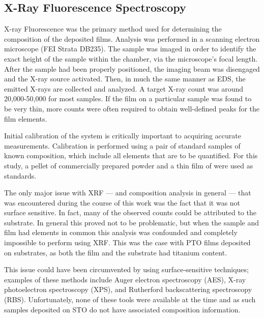 \lipsum


\subsection{X-Ray Fluorescence Spectroscopy}
\label{sec:Methods-XRF}

X-ray Fluorescence was the primary method used for determining the composition of the deposited films. Analysis was performed in a scanning electron microscope (FEI Strata DB235). The sample was imaged in order to identify the exact height of the sample within the chamber, via the microscope's focal length. After the sample had been properly positioned, the imaging beam was disengaged and the X-ray source activated. Then, in much the same manner as EDS, the emitted X-rays are collected and analyzed. A target X-ray count was around 20,000-50,000 for most samples. If the film on a particular sample was found to be very thin, more counts were often required to obtain well-defined peaks for the film elements. 

Initial calibration of the system is critically important to acquiring accurate measurements. Calibration is performed using a pair of standard samples of known composition, which include all elements that are to be quantified. For this study, a pellet of commercially prepared \PTO{} powder and a thin film of  were used as standards. 

The only major issue with XRF --- and composition analysis in general --- that was encountered during the course of this work was the fact that it was not surface sensitive. In fact, many of the observed counts could be attributed to the substrate. In general this proved not to be problematic, but when the sample and film had elements in common this analysis was confounded and completely impossible to perform using XRF. This was the case with PTO films deposited on  substrates, as both the film and the substrate had titanium content. 

This issue could have been circumvented by using surface-sensitive techniques; examples of these methods include Auger electron spectroscopy (AES), X-ray photoelectron spectroscopy (XPS), and Rutherford backscattering spectroscopy (RBS). Unfortunately, none of these tools were available at the time and as such samples deposited on STO do not have associated composition information. 


